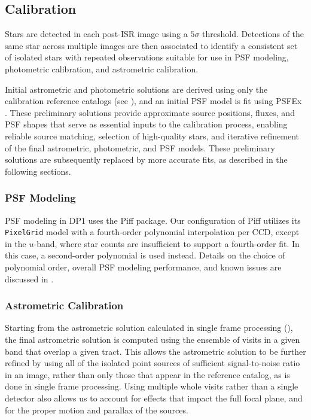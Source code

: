 \subsection{Calibration}
\label{ssec:drp_calibration}
Stars are detected in each post-\gls{ISR} image using a $5\sigma$ threshold.
Detections of the same star across multiple images are then associated to identify a consistent set of isolated stars with repeated observations suitable for use in PSF modeling, photometric \gls{calibration}, and astrometric \gls{calibration}.

Initial astrometric and photometric solutions are derived using only the calibration reference catalogs (see ), and an initial \gls{PSF} model is fit using PSFEx \citep{2011ASPC..442..435B}.
These preliminary solutions provide approximate source positions, fluxes, and \gls{PSF} shapes that serve as essential inputs to the \gls{calibration} process, enabling reliable source matching, selection of high-quality stars, and iterative refinement of the final astrometric, photometric, and \gls{PSF} models.
These preliminary solutions are subsequently replaced by more accurate fits, as described in the following sections.

\subsubsection{PSF Modeling}
\label{ssec:psf_modelling}
\gls{PSF} modeling in \gls{DP1} uses the Piff \citep{DES:2020vau} package.
Our configuration of Piff utilizes its \texttt{PixelGrid} model with a fourth-order polynomial interpolation per \gls{CCD}, except in the $u$-band, where star counts are insufficient to support a fourth-order fit.
In this case, a second-order polynomial is used instead.
Details on the choice of polynomial order, overall \gls{PSF} modeling performance, and known issues are discussed in .

\subsubsection{Astrometric Calibration}
\label{ssec:global_astrometric_calibration}
Starting from the astrometric solution calculated in single frame processing (), the final astrometric solution is computed using the ensemble of visits in a given band that overlap a given \gls{tract}.
This allows the astrometric solution to be further refined by using all of the isolated point sources of sufficient signal-to-noise ratio in an image, rather than only those that appear in the reference catalog, as is done in single frame processing.
Using multiple whole visits rather than a single detector also allows us to account for effects that impact the full focal plane, and for the proper motion and parallax of the sources.

